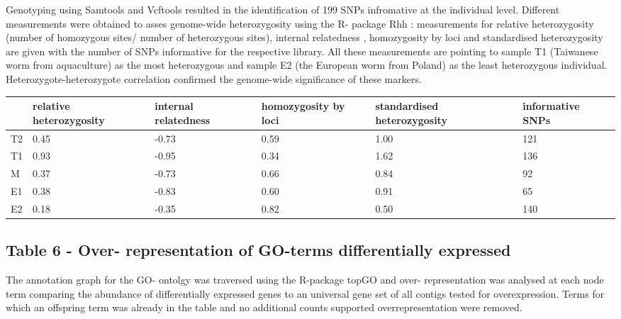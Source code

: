\documentclass[10pt]{bmc_article}
\newenvironment{bmcformat}{\begin{raggedright}\baselineskip20pt\sloppy\setboolean{publ}{false}}{\end{raggedright}\baselineskip20pt\sloppy}
\begin{document}
\begin{bmcformat}
Genotyping using Samtools \cite{journals/bioinformatics/LiHWFRHMAD09}
and Vcftools \cite{pmid21653522} resulted in the identification of
199 SNPs infromative at the individual
level. Different measurements were obtained to asses genome-wide
heterozygosity using the R- package Rhh \cite{pmid21565077}:
measurements for relative heterozygosity (number of homozygous sites/
number of heterozygous sites), internal relatedness
\cite{pmid11571049}, homozygosity by loci \cite{pmid17107491} and
standardised heterozygosity \cite{coltman81j} are given with the
number of SNPs informative for the respective library. All these
measurements are pointing to sample T1 (Taiwanese worm from
aquaculture) as the most heterozygous and sample E2 (the European worm
from Poland) as the least heterozygous
individual. Heterozygote-heterozygote correlation \cite{pmid21565077}
confirmed the genome-wide significance of these markers.

\begin{table}[ht]
\begin{center}
\begin{tabular}{p{2.5cm}p{2cm}p{2cm}p{2cm}p{2cm}p{2cm}}
  \hline
 & relative heterozygosity & internal relatedness & homozygosity by loci & standardised heterozygosity & informative SNPs \\ 
  \hline
T2 & 0.45 & -0.73 & 0.59 & 1.00 & 121 \\ 
  T1 & 0.93 & -0.95 & 0.34 & 1.62 & 136 \\ 
  M & 0.37 & -0.73 & 0.66 & 0.84 & 92 \\ 
  E1 & 0.38 & -0.83 & 0.60 & 0.91 & 65 \\ 
  E2 & 0.18 & -0.35 & 0.82 & 0.50 & 140 \\ 
   \hline
\end{tabular}
\end{center}
\end{table}
\subsection*{Table 6 - Over- representation of GO-terms differentially
  expressed}

The annotation graph for the GO- ontolgy was traversed using the
R-package topGO \cite{topGO} and over- representation was analysed at
each node term comparing the abundance of differentially expressed
genes to an universal gene set of all contigs tested for
overexpression. Terms for which an offspring term was already in the
table and no additional counts supported overrepresentation were
removed.


\end{bmcformat}
\end{document}

